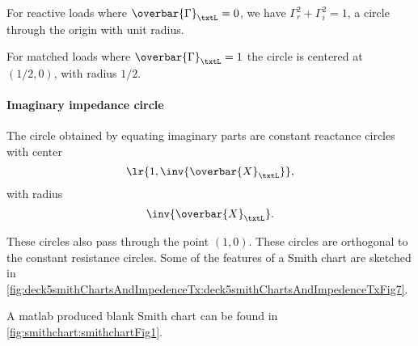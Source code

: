 For reactive loads where \( \overbar{\Gamma}_\txtL = 0 \), we have \( \Gamma_r^2 + \Gamma_i^2 = 1 \), a circle through the origin with unit radius.

For matched loads where \( \overbar{\Gamma}_\txtL = 1 \) the circle is centered at \( (1/2, 0) \), with radius \( 1/2 \).

\paragraph{Imaginary impedance circle}
The circle obtained by equating imaginary parts are constant reactance circles with center
\begin{equation}\label{eqn:uwavesDeck5SmithChartCore:640}
\lr{ 1, \inv{\overbar{X}_\txtL } },
\end{equation}
with radius
\begin{equation}\label{eqn:uwavesDeck5SmithChartCore:660}
\inv{\overbar{X}_\txtL}.
\end{equation}

These circles also pass through the point \( (1,0) \).  These circles are orthogonal to the constant resistance circles.  Some of the features of a Smith chart are sketched in \cref{fig:deck5smithChartsAndImpedenceTx:deck5smithChartsAndImpedenceTxFig7}.

A matlab produced blank Smith chart can be found in \cref{fig:smithchart:smithchartFig1}.



